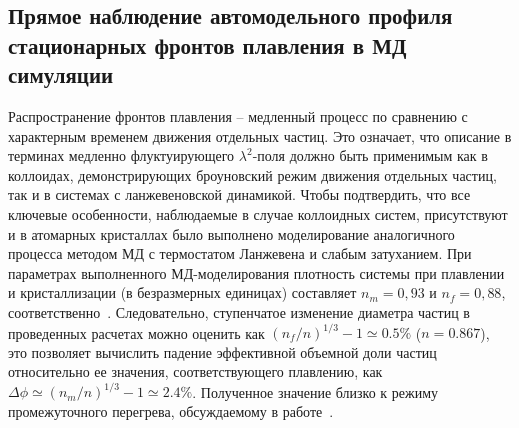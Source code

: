 %

\subsection{Прямое наблюдение автомодельного профиля стационарных фронтов плавления в МД симуляции}
\label{SSMF-Results-MD}

Распространение фронтов плавления -- медленный процесс по сравнению с характерным временем движения отдельных частиц.
Это означает, что описание в терминах медленно флуктуирующего $\lambda^2$-поля должно быть применимым как в коллоидах, демонстрирующих броуновский режим движения отдельных частиц, так и в системах с ланжевеновской динамикой.
Чтобы подтвердить, что все ключевые особенности, наблюдаемые в случае коллоидных систем, присутствуют и в атомарных кристаллах было выполнено моделирование аналогичного процесса методом МД с термостатом Ланжевена и слабым затуханием.
При параметрах выполненного МД-моделирования плотность системы при плавлении и кристаллизации (в безразмерных единицах) составляет $ n_m = 0,93 $ и $ n_f = 0,88 $, соответственно~\cite{10.1080/00268979500100911}.
Следовательно, ступенчатое изменение диаметра частиц в проведенных расчетах можно оценить как $ (n_f / n) ^ {1/3} -1 \simeq 0.5 \% $ ($ n = 0.867 $), это позволяет вычислить падение эффективной объемной доли частиц относительно ее значения, соответствующего плавлению, как
$\Delta \phi  \simeq (n_m/n)^{1/3}-1\simeq 2.4\%$.
Полученное значение близко к режиму промежуточного перегрева, обсуждаемому в работе~\cite{10.1038/ncomms7942}.

